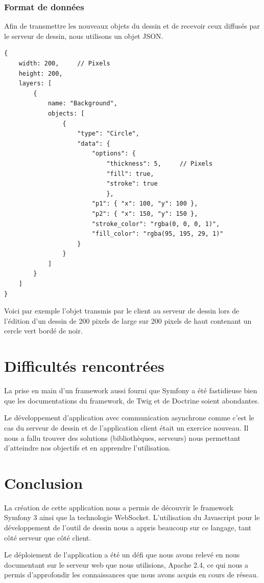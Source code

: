 \documentclass[a4paper]{article}
\begin{document}
\subsubsection{Format de données}
Afin de transmettre les nouveaux objets du dessin et de recevoir ceux diffusés par le serveur de dessin, nous utilisons un objet JSON.
\begin{lstlisting}
{
	width: 200,		// Pixels
	height: 200,
	layers: [
		{
			name: "Background",
			objects: [
				{
					"type": "Circle",
					"data": {
						"options": {
							"thickness": 5,		// Pixels
							"fill": true,
							"stroke": true
							},
						"p1": { "x": 100, "y": 100 },
						"p2": { "x": 150, "y": 150 },
						"stroke_color": "rgba(0, 0, 0, 1)",
						"fill_color": "rgba(95, 195, 29, 1)"
					}
				}
			]
		}
	]
}
\end{lstlisting}
Voici par exemple l'objet transmis par le client au serveur de dessin lors de l'édition d'un dessin de 200 pixels de large sur 200 pixels de haut contenant un cercle vert bordé de noir.

\section{Difficultés rencontrées}
La prise en main d'un framework aussi fourni que Symfony a été fastidieuse bien que les documentations du framework, de Twig et de Doctrine soient abondantes.

Le développement d'application avec communication asynchrone comme c'est le cas du serveur de dessin et de l'application client était un exercice nouveau. Il nous a fallu trouver des solutions (bibliothèques, serveurs) nous permettant d'atteindre nos objectifs et en apprendre l'utilisation.

\section{Conclusion}
La création de cette application nous a permis de découvrir le framework Symfony 3 ainsi que la technologie \cite{WebSockets}WebSocket. L'utilisation du Javascript pour le développement de l'outil de dessin nous a appris beaucoup sur ce langage, tant côté serveur que côté client.

Le déploiement de l'application a été un défi que nous avons relevé en nous documentant sur le serveur web que nous utilisions, Apache 2.4, ce qui nous a permis d'approfondir les connaissances que nous avons acquis en cours de réseau.
\newpage


\end{document}
